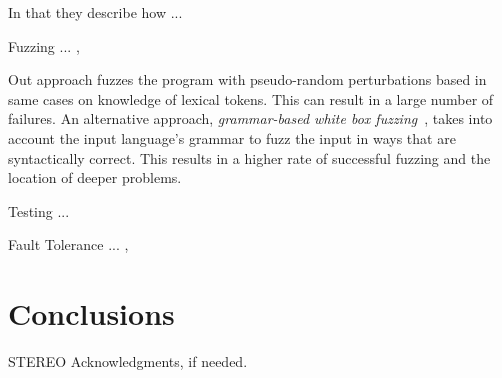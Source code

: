 \documentclass[10pt]{sigplanconf}
\begin{document}
In that they describe how ... %

Fuzzing ... \cite{TJC08}, \cite{WWGZ11}

Out approach fuzzes the program with pseudo-random
perturbations based in same cases on knowledge of
lexical tokens.
This can result in a large number of failures.
An alternative approach, {\em grammar-based white box fuzzing}~\cite{God08},
takes into account the input language's grammar to fuzz the input in
ways that are syntactically correct.
This results in a higher rate of successful fuzzing and the location
of deeper problems.

Testing ... \cite{HAM06}

Fault Tolerance ... \cite{KOKR07}, \cite{LYU95}

\section{Conclusions} %
\label{sec:conclusions}


\acks

STEREO
Acknowledgments, if needed.








\end{document}
